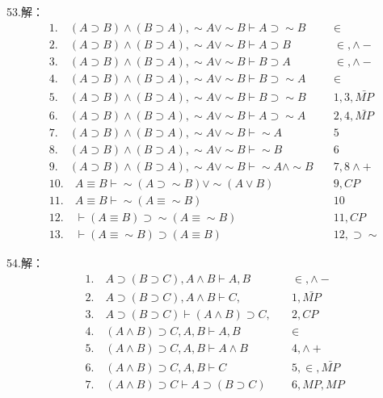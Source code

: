 \documentclass[a4paper]{ctexart}
\begin{document}
\noindent 53.解：
\begin{align*}
  &1. \quad (A\supset B)\wedge(B\supset A),\sim A\vee \sim B \vdash A\supset \sim B &\quad \in \\
  &2. \quad (A\supset B)\wedge(B\supset A),\sim A\vee \sim B \vdash A\supset B &\quad \in,\wedge- \\
  &3. \quad (A\supset B)\wedge(B\supset A),\sim A\vee \sim B \vdash B\supset A &\quad \in,\wedge- \\
  &4. \quad (A\supset B)\wedge(B\supset A),\sim A\vee \sim B \vdash B\supset \sim A &\quad \in \\
  &5. \quad (A\supset B)\wedge(B\supset A),\sim A\vee \sim B \vdash B\supset \sim B &\quad 1,3,\bar{MP} \\
  &6. \quad (A\supset B)\wedge(B\supset A),\sim A\vee \sim B \vdash A\supset \sim A &\quad 2,4,\bar{MP} \\
  &7. \quad (A\supset B)\wedge(B\supset A),\sim A\vee \sim B \vdash \sim A &\quad 5 \\
  &8. \quad (A\supset B)\wedge(B\supset A),\sim A\vee \sim B \vdash \sim B &\quad 6 \\
  &9. \quad (A\supset B)\wedge(B\supset A),\sim A\vee \sim B \vdash \sim A\wedge \sim B &\quad 7,8\wedge+ \\
  &10.\quad A\equiv B \vdash \sim(A\supset \sim B)\vee \sim(A\vee B) &\quad 9,CP\\
  &11.\quad A\equiv B \vdash \sim(A\equiv \sim B) &\quad 10\\
  &12.\quad \vdash (A\equiv B)\supset \sim(A\equiv \sim B) &\quad 11,CP\\
  &13.\quad \vdash (A\equiv \sim B)\supset (A\equiv B) &\quad 12,\supset\sim
\end{align*}

\noindent 54.解：
\begin{align*}
  &1.\quad A\supset(B\supset C), A\wedge B \vdash A,B &\quad \in,\wedge- \\
  &2.\quad A\supset(B\supset C), A\wedge B \vdash C, &\quad 1,\bar{MP} \\
  &3.\quad A\supset(B\supset C) \vdash (A\wedge B)\supset C, &\quad 2,CP \\
  &4.\quad (A\wedge B)\supset C,A,B \vdash A,B &\quad \in \\
  &5.\quad (A\wedge B)\supset C,A,B \vdash A\wedge B &\quad4, \wedge+ \\
  &6.\quad (A\wedge B)\supset C,A,B \vdash C &\quad5,\in,\bar{MP} \\
  &7.\quad (A\wedge B)\supset C \vdash A\supset(B\supset C) &\quad 6,MP,MP \\  
\end{align*}
\end{document}
